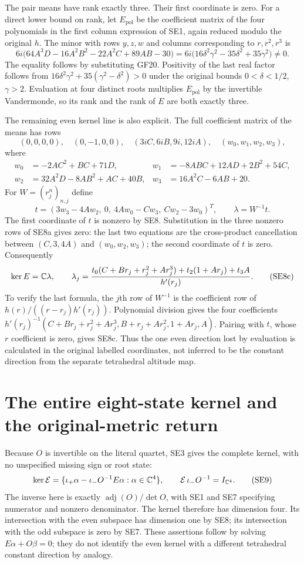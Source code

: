 The pair means have rank exactly three. Their first coordinate is zero.
For a direct lower bound on rank, let $E_{\mathrm{pol}}$ be the coefficient
matrix of the four polynomials in the first column expression of SE1,
again reduced modulo the original $h$. The minor with rows $y,z,w$
and columns corresponding to $r,r^2,r^3$ is
\[
 6i\bigl(64A^3D-16A^2B^2-22A^2C+89AB-30\bigr)
 =6i\bigl(16\delta^2\gamma^2-35\delta^2+35\gamma^2\bigr)\ne0.
 \tag{SE8}
\]
The equality follows by substituting GF20. Positivity of the last
real factor follows from
$16\delta^2\gamma^2+35(\gamma^2-\delta^2)>0$ under the original
bounds $0<\delta<1/2$, $\gamma>2$. Evaluation at four distinct
roots multiplies $E_{\mathrm{pol}}$ by the invertible Vandermonde,
so its rank and the rank of $E$ are both exactly three.

The remaining even kernel line is also explicit. The full coefficient
matrix of the means has rows
\[
 (0,0,0,0),\quad(0,-1,0,0),\quad(3iC,6iB,9i,12iA),\quad
 (w_0,w_1,w_2,w_3),
\]
where
\[
\begin{aligned}
 w_0&=-2AC^2+BC+71D,&w_1&=-8ABC+12AD+2B^2+54C,\\
 w_2&=32A^2D-8AB^2+AC+40B,&w_3&=16A^2C-6AB+20.
\end{aligned}\tag{SE8a}
\]
For $W=(r_j^n)_{n,j}$ define
\[
 t=(3w_3-4Aw_2,\ 0,\ 4Aw_0-Cw_3,\ Cw_2-3w_0)^T,
 \qquad \lambda=W^{-1}t.
 \tag{SE8b}
\]
The first coordinate of $t$ is nonzero by SE8. Substitution in
the three nonzero rows of SE8a gives zero: the last two equations
are the cross-product cancellation between $(C,3,4A)$ and
$(w_0,w_2,w_3)$; the second coordinate of $t$ is zero. Consequently
\[
 \ker E=\mathbb C\lambda,\qquad
 \lambda_j=
 \frac{t_0(C+Br_j+r_j^2+Ar_j^3)+t_2(1+Ar_j)+t_3A}{h'(r_j)}.
 \tag{SE8c}
\]
To verify the last formula, the $j$th row of $W^{-1}$ is the
coefficient row of $h(r)/((r-r_j)h'(r_j))$. Polynomial division
gives the four coefficients
$h'(r_j)^{-1}(C+Br_j+r_j^2+Ar_j^3,B+r_j+Ar_j^2,1+Ar_j,A)$.
Pairing with $t$, whose $r$ coefficient is zero, gives SE8c.
Thus the one even direction lost by evaluation is calculated
in the original labelled coordinates, not inferred to be the
constant direction from the separate tetrahedral altitude map.

\section{The entire eight-state kernel and the original-metric return}
Because $O$ is invertible on the literal quartet, SE3 gives the complete
kernel, with no unspecified missing sign or root state:
\[
 \ker\mathcal E=
 \{\iota_+\alpha-\iota_-O^{-1}E\alpha:\alpha\in\mathbb C^4\},
 \qquad
 \mathcal E\,\iota_-O^{-1}=I_{\mathbb C^4}.
 \tag{SE9}
\]
The inverse here is exactly $\operatorname{adj}(O)/\det O$, with
SE1 and SE7 specifying numerator and nonzero denominator. The kernel
therefore has dimension four. Its intersection with the even subspace
has dimension one by SE8; its intersection with the odd subspace is zero
by SE7. These assertions follow by solving $E\alpha+O\beta=0$;
they do not identify the even kernel with a different tetrahedral
constant direction by analogy.

